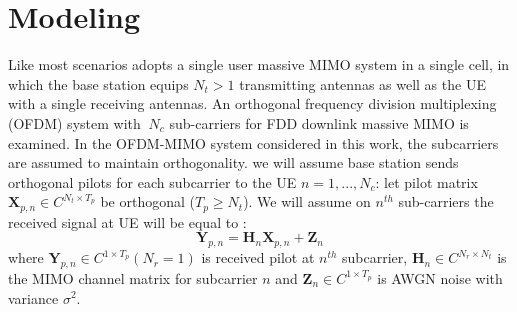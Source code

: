 \documentclass[lettersize,journal]{IEEEtran}
\begin{document}
\section{Modeling}

Like most scenarios adopts a single user massive MIMO system in a single cell, in which the base station equips
\begin{math} N_{t} > 1\end{math} transmitting antennas as well as the UE with a single
receiving antennas. An orthogonal frequency division multiplexing (OFDM) system with \begin{math}\ N_{c}\end{math} sub-carriers for FDD downlink massive MIMO is examined. In the OFDM-MIMO system considered in this work, the subcarriers are assumed to maintain orthogonality. 
we will assume base station sends orthogonal pilots for each subcarrier to the UE 
\begin{math}
	n=1,...,N_{c}
\end{math}: let pilot matrix
\begin{math} \textbf{X}_{p,n}\in C^{N_{t}\times T_{p}}  \end{math} be orthogonal
(\begin{math}
	T_{p} \geq N_{t}
\end{math}).
We will assume on  \begin{math}  {n^{th}} \end{math} sub-carriers the received signal at UE will be equal to : 
\begin{equation}
	\textbf{Y}_{p,n}=\textbf{H}_{n}\textbf{X}_{p,n}+\textbf{Z}_{n} 
\end{equation}
where 
\begin{math}
	\textbf{Y}_{p,n} \in C^{1\times T_{p}}
(N_{r}=1)
\end{math} is received pilot at \begin{math}  {n^{th}} \end{math} subcarrier,  
\begin{math}
	\textbf{H}_{n} \in  C^{N_{r}\times N_{t}}
\end{math} is the MIMO channel matrix for subcarrier \begin{math} n \end{math}
and \begin{math} \textbf{Z}_{n}\in C^{1\times T_{p}} \end{math} is AWGN noise with variance \begin{math}  \sigma^{2} \end{math}.
\end{document}
